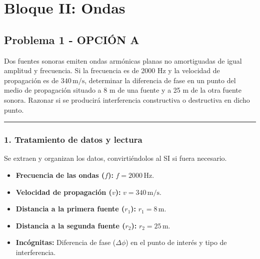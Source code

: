 \newpage

\section{Bloque II: Ondas}
\label{sec:ondas_2000_jun_ord}

\subsection{Problema 1 - OPCIÓN A}
\label{subsec:2A_2000_jun_ord}

\begin{cajaenunciado}
Dos fuentes sonoras emiten ondas armónicas planas no amortiguadas de igual amplitud y frecuencia. Si la frecuencia es de 2000 Hz y la velocidad de propagación es de $340\,\text{m/s}$, determinar la diferencia de fase en un punto del medio de propagación situado a 8 m de una fuente y a 25 m de la otra fuente sonora. Razonar si se producirá interferencia constructiva o destructiva en dicho punto.
\end{cajaenunciado}
\hrule

\subsubsection*{1. Tratamiento de datos y lectura}
Se extraen y organizan los datos, convirtiéndolos al SI si fuera necesario.
\begin{itemize}
    \item \textbf{Frecuencia de las ondas ($f$):} $f = 2000 \, \text{Hz}$.
    \item \textbf{Velocidad de propagación ($v$):} $v = 340 \, \text{m/s}$.
    \item \textbf{Distancia a la primera fuente ($r_1$):} $r_1 = 8 \, \text{m}$.
    \item \textbf{Distancia a la segunda fuente ($r_2$):} $r_2 = 25 \, \text{m}$.
    \item \textbf{Incógnitas:} Diferencia de fase ($\Delta\phi$) en el punto de interés y tipo de interferencia.
\end{itemize}

